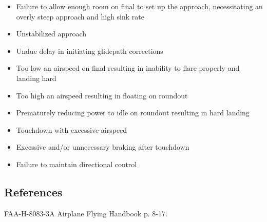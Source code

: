 \begin{itemize}
  \item Failure to allow enough room on final to set up the approach,
    necessitating an overly steep approach and high sink rate
  \item Unstabilized approach
  \item Undue delay in initiating glidepath corrections
  \item Too low an airspeed on final resulting in inability to flare properly
    and landing hard
  \item Too high an airspeed resulting in floating on roundout
  \item Prematurely reducing power to idle on roundout resulting in hard
    landing
  \item Touchdown with excessive airspeed
  \item Excessive and/or unnecessary braking after touchdown
  \item Failure to maintain directional control
\end{itemize}

\subsection{References}

FAA-H-8083-3A Airplane Flying Handbook p. 8-17.
